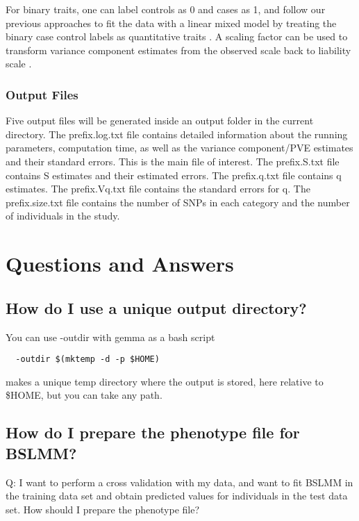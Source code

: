 \documentclass[11pt]{article}
\begin{document}
For binary traits, one can label controls as 0 and cases as 1, and
follow our previous approaches to fit the data with a linear mixed
model by treating the binary case control labels as quantitative
traits \cite{Zhou:2013}. A scaling factor can be used to transform
variance component estimates from the observed scale back to liability
scale \cite{Zhou:2013}.

\subsubsection{Output Files}

Five output files will be generated inside an output folder in the
current directory. The prefix.log.txt file contains detailed
information about the running parameters, computation time, as well as
the variance component/PVE estimates and their standard errors. This
is the main file of interest. The prefix.S.txt file contains S
estimates and their estimated errors. The prefix.q.txt file contains q
estimates. The prefix.Vq.txt file contains the standard errors for
q. The prefix.size.txt file contains the number of SNPs in each
category and the number of individuals in the study.

\clearpage
\newpage

\section{Questions and Answers}

\subsection{How do I use a unique output directory?}

You can use -outdir with gemma as a bash script

\begin{verbatim}
  -outdir $(mktemp -d -p $HOME)
\end{verbatim}

makes a unique temp directory where the output is stored, here
relative to \$HOME, but you can take any path.


\subsection{How do I prepare the phenotype file for BSLMM?}

Q: I want to perform a cross validation with my data, and want to fit
BSLMM in the training data set and obtain predicted values for
individuals in the test data set. How should I prepare the phenotype
file?
\end{document}
